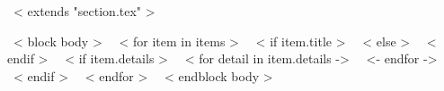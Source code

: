~< extends "section.tex" >~

~< block body >~
    ~< for item in items >~
      ~< if item.title >~
      ~< else >~
      ~< endif >~
        ~< if item.details >~
        ~< for detail in item.details ->~
        ~<- endfor ->~
        ~< endif >~
    ~< endfor >~
~< endblock body >~
